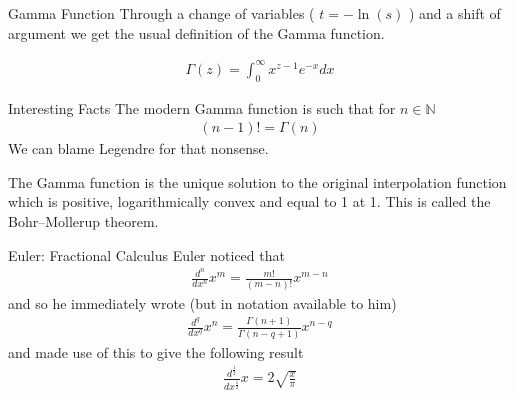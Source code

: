 \documentclass[pdf]{beamer}
\newcommand{\Ntrl}{\mathbb{N}}
\begin{document}
\begin{frame}{Gamma Function}
Through a change of variables ( $ t = -\ln(s) $ ) and a shift of argument we get the usual definition of the Gamma function.
    \begin{definition}
        \begin{align*}
            \Gamma(z) = \int_0^\infty x^{z-1} e^{-x} dx
        \end{align*}
    \end{definition}    
\end{frame}
\begin{frame}{Interesting Facts}
    The modern Gamma function is such that for $ n \in \Ntrl $
    \begin{align*}
        (n-1)! = \Gamma(n)
    \end{align*}
    We can blame Legendre for that nonsense.


    The Gamma function is the unique solution to the original interpolation function which is positive, logarithmically convex and equal to 1 at 1. This is called the  Bohr–Mollerup theorem.
\end{frame}
\begin{frame}{Euler: Fractional Calculus}
    Euler noticed that
    \begin{align*}
        \frac{d^n}{dx^n} x^m = \frac{m!}{(m-n)!}x^{m-n}
    \end{align*}
    and so he immediately wrote (but in notation available to him)
    \begin{align*}
        \frac{d^q}{dx^q} x^n = \frac{\Gamma(n+1)}{\Gamma(n-q+1)} x^{n-q}
    \end{align*}
    and made use of this to give the following result
    \begin{align*}
        \frac{d^\frac{1}{2}}{dx^\frac{1}{2}} x = 2 \sqrt{\frac{x}{\pi}}
    \end{align*}
\end{frame}
\end{document}
